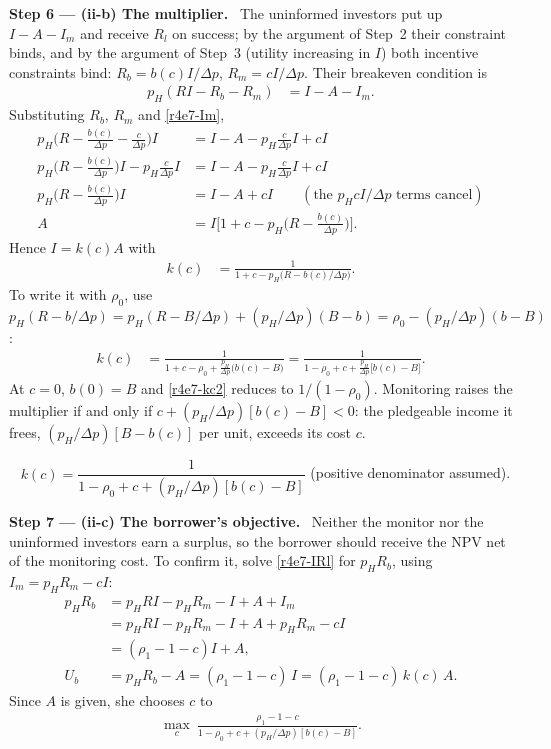 \documentclass[11pt,a4paper]{article}
\newcommand{\step}[2]{\par\medskip\noindent\textbf{Step #1 --- #2.}~}
\newcommand{\answer}[1]{\par\smallskip\noindent\fbox{\textbf{Answer #1.}}~}
\begin{document}
\step{6}{(ii-b) The multiplier} The uninformed investors put up $I-A-I_m$ and receive $R_l$ on
success; by the argument of Step~2 their constraint binds, and by the argument of Step~3
(utility increasing in $I$) both incentive constraints bind:
$R_b=b(c)I/\Delta p$, $R_m=cI/\Delta p$. Their breakeven condition is
\begin{align}
  p_H(RI-R_b-R_m) &= I-A-I_m. \label{r4e7-IRl}
\end{align}
Substituting $R_b$, $R_m$ and \eqref{r4e7-Im},
\begin{align}
  p_H\Big(R-\frac{b(c)}{\Delta p}-\frac{c}{\Delta p}\Big)I &= I-A-p_H\frac{c}{\Delta p}I+cI \nonumber\\
  p_H\Big(R-\frac{b(c)}{\Delta p}\Big)I-p_H\frac{c}{\Delta p}I &= I-A-p_H\frac{c}{\Delta p}I+cI \nonumber\\
  p_H\Big(R-\frac{b(c)}{\Delta p}\Big)I &= I-A+cI \qquad(\text{the }p_Hc I/\Delta p\text{ terms cancel}) \nonumber\\
  A &= I\Big[1+c-p_H\Big(R-\frac{b(c)}{\Delta p}\Big)\Big]. \nonumber
\end{align}
Hence $I=k(c)A$ with
\begin{align}
  k(c) &= \frac{1}{1+c-p_H\big(R-b(c)/\Delta p\big)}. \label{r4e7-kc}
\end{align}
To write it with $\rho_0$, use $p_H(R-b/\Delta p)=p_H(R-B/\Delta p)+(p_H/\Delta p)(B-b)=\rho_0-(p_H/\Delta p)(b-B)$:
\begin{align}
  k(c) &= \frac{1}{1+c-\rho_0+\frac{p_H}{\Delta p}\big(b(c)-B\big)}
        = \frac{1}{1-\rho_0+c+\frac{p_H}{\Delta p}\big[b(c)-B\big]}. \label{r4e7-kc2}
\end{align}
At $c=0$, $b(0)=B$ and \eqref{r4e7-kc2} reduces to $1/(1-\rho_0)$. Monitoring raises the
multiplier if and only if $c+(p_H/\Delta p)[b(c)-B]<0$: the pledgeable income it frees,
$(p_H/\Delta p)[B-b(c)]$ per unit, exceeds its cost $c$.

\answer{(ii-b)} $k(c)=\dfrac{1}{1-\rho_0+c+(p_H/\Delta p)[b(c)-B]}$ (positive denominator assumed).

\step{7}{(ii-c) The borrower's objective} Neither the monitor nor the uninformed investors earn
a surplus, so the borrower should receive the NPV net of the monitoring cost. To confirm it,
solve \eqref{r4e7-IRl} for $p_HR_b$, using $I_m=p_HR_m-cI$:
\begin{align}
  p_HR_b &= p_HRI-p_HR_m-I+A+I_m \nonumber\\
         &= p_HRI-p_HR_m-I+A+p_HR_m-cI \nonumber\\
         &= (\rho_1-1-c)I+A, \nonumber\\
  U_b &= p_HR_b-A = (\rho_1-1-c)\,I = (\rho_1-1-c)\,k(c)\,A. \label{r4e7-Ubc}
\end{align}
Since $A$ is given, she chooses $c$ to
\begin{align}
  \max_c\ \frac{\rho_1-1-c}{1-\rho_0+c+(p_H/\Delta p)[b(c)-B]}. \label{r4e7-max}
\end{align}
\end{document}
